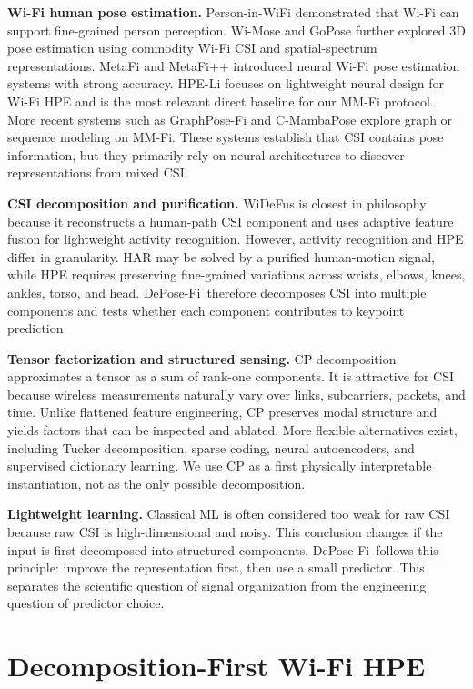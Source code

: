 \documentclass[letterpaper]{article}
\newcommand{\method}{DePose-Fi}
\begin{document}
\textbf{Wi-Fi human pose estimation.}
Person-in-WiFi demonstrated that Wi-Fi can support fine-grained person perception. Wi-Mose and GoPose further explored 3D pose estimation using commodity Wi-Fi CSI and spatial-spectrum representations. MetaFi and MetaFi++ introduced neural Wi-Fi pose estimation systems with strong accuracy. HPE-Li focuses on lightweight neural design for Wi-Fi HPE and is the most relevant direct baseline for our MM-Fi protocol. More recent systems such as GraphPose-Fi and C-MambaPose explore graph or sequence modeling on MM-Fi. These systems establish that CSI contains pose information, but they primarily rely on neural architectures to discover representations from mixed CSI.

\textbf{CSI decomposition and purification.}
WiDeFus is closest in philosophy because it reconstructs a human-path CSI component and uses adaptive feature fusion for lightweight activity recognition. However, activity recognition and HPE differ in granularity. HAR may be solved by a purified human-motion signal, while HPE requires preserving fine-grained variations across wrists, elbows, knees, ankles, torso, and head. \method\ therefore decomposes CSI into multiple components and tests whether each component contributes to keypoint prediction.

\textbf{Tensor factorization and structured sensing.}
CP decomposition approximates a tensor as a sum of rank-one components. It is attractive for CSI because wireless measurements naturally vary over links, subcarriers, packets, and time. Unlike flattened feature engineering, CP preserves modal structure and yields factors that can be inspected and ablated. More flexible alternatives exist, including Tucker decomposition, sparse coding, neural autoencoders, and supervised dictionary learning. We use CP as a first physically interpretable instantiation, not as the only possible decomposition.

\textbf{Lightweight learning.}
Classical ML is often considered too weak for raw CSI because raw CSI is high-dimensional and noisy. This conclusion changes if the input is first decomposed into structured components. \method\ follows this principle: improve the representation first, then use a small predictor. This separates the scientific question of signal organization from the engineering question of predictor choice.

\section{Decomposition-First Wi-Fi HPE}
\end{document}
